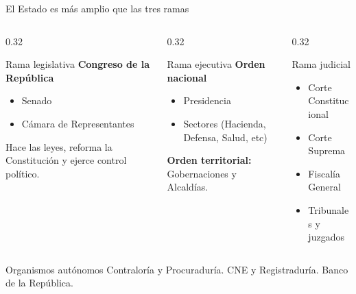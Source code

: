 \documentclass{beamer}
\begin{document}
\begin{frame}{El Estado es m\'as amplio que las tres ramas}
\scriptsize
\begin{columns}[T,onlytextwidth]
  \begin{column}{0.32\textwidth}
    \begin{block}{Rama legislativa}
      \textbf{Congreso de la Rep\'ublica}
      \begin{itemize}
        \item Senado
        \item C\'amara de Representantes
      \end{itemize}
      Hace las leyes, reforma la Constituci\'on y ejerce control pol\'itico.
    \end{block}
  \end{column}
  \begin{column}{0.32\textwidth}
    \begin{block}{Rama ejecutiva}
      \textbf{Orden nacional}
      \begin{itemize}
        \item Presidencia
        \item Sectores (Hacienda, Defensa, Salud, etc)
      \end{itemize}
      \textbf{Orden territorial:} Gobernaciones y Alcald\'ias.
    \end{block}
  \end{column}
  \begin{column}{0.32\textwidth}
    \begin{block}{Rama judicial}
      \begin{itemize}
        \item Corte Constitucional
        \item Corte Suprema 
        \item Fiscal\'ia General
        \item Tribunales y juzgados
      \end{itemize}
    \end{block}
  \end{column}
\end{columns}
\vspace{0.15cm}
\begin{alertblock}{Organismos autónomos}
 Contralor\'ia y Procuraduría.
\quad  CNE y Registradur\'ia.
\quad Banco de la Rep\'ublica.
\end{alertblock}
\end{frame}
\end{document}

